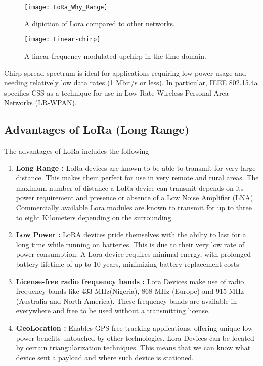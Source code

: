 \begin{figure}[p]
\texttt{[image: LoRa\_Why\_Range]}
\centering
\caption{A dipiction of Lora compared to other networks.}
\centering
\label{fig:lo1}


\end{figure}

\begin{figure}[p]

\texttt{[image: Linear-chirp]}
\centering
\caption{A linear frequency modulated upchirp in the time domain.}
\centering
\label{fig:css}
\end{figure}

Chirp spread spectrum is ideal for applications requiring low power usage and needing relatively low data rates (1 Mbit/s or less). In particular, IEEE 802.15.4a specifies CSS as a technique for use in Low-Rate Wireless Personal Area Networks (LR-WPAN).

\subsection{Advantages of LoRa (Long Range)}
The advantages of LoRa includes the following
\begin{enumerate}
\item \textbf{Long Range :} LoRa devices are known to be able to transmit for very large distance. This makes them perfect for use in very remote and rural areas. The maximum number of distance a LoRa device can transmit depends on its power requirement and presence or absence of a Low Noise Amplifier (LNA). Commercially available Lora modules are known to transmit for up to three to eight Kilometers depending on the surrounding. 
\item \textbf{Low Power :} LoRA devices pride themselves with the abilty to last for a long time while running on batteries. This is due to their very low rate of power consumption. A Lora device requires minimal energy, with prolonged battery lifetime of up to 10 years, minimizing battery replacement costs
\item \textbf{License-free radio frequency bands :}  Lora Devices make use of radio frequency bands like 433 MHz(Nigeria), 868 MHz (Europe) and 915 MHz (Australia and North America). These frequency bands are available in everywhere and free to be used without a transmitting license. 
\item \textbf{GeoLocation :}  Enables GPS-free tracking applications, offering unique low power benefits untouched by other technologies. Lora Devices can be located by certain triangularization techniques. This means that we can know what device sent a payload and where such device is stationed. 
\end{enumerate}


